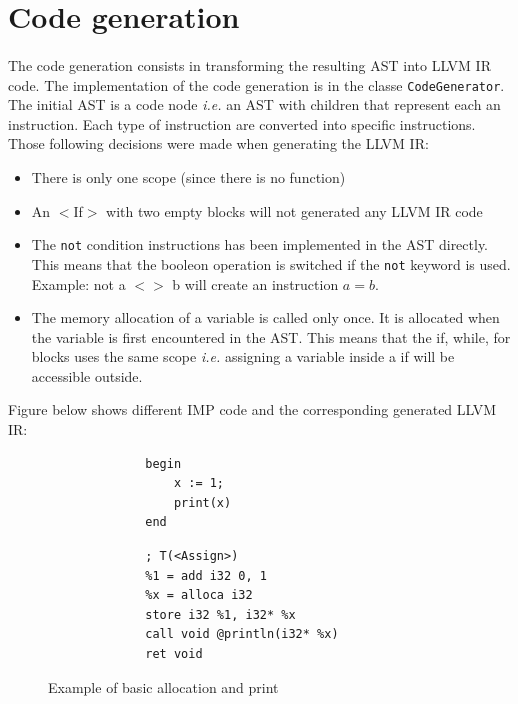 \documentclass[letterpaper]{article}
\begin{document}
\section{Code generation}

\paragraph{}

The code generation consists in transforming the resulting AST into
LLVM IR code. The implementation of the code generation is in the
classe \texttt{CodeGenerator}. The initial AST is a code node \textit{i.e.}
an AST with children that represent each an instruction. Each type of
instruction are converted into specific instructions. Those following
decisions were made when generating the LLVM IR:

\begin{itemize}
    \item There is only one scope (since there is no function)
    \item An $<$If$>$ with
    two empty blocks will not generated any LLVM IR code
    \item The \texttt{not} condition
    instructions has been implemented in the AST directly. This means that
    the booleon operation is switched if the \texttt{not} keyword is used.
    Example: not a $<>$ b will create an instruction $a = b$.
    \item The memory allocation of a variable is called only once.
    It is allocated when the variable is first encountered in the AST.
    This means that the if, while, for blocks uses the same scope \textit{i.e.}
    assigning a variable inside a if will be accessible outside.

\end{itemize}

Figure below shows different IMP code and the corresponding generated
LLVM IR:

\begin{figure}[H]
    \begin{subfigure}{.5\textwidth}
        \begin{lstlisting}
        begin
            x := 1;
            print(x)
        end
        \end{lstlisting}
    \end{subfigure}
    \begin{subfigure}{.5\textwidth}
        \begin{lstlisting}
        ; T(<Assign>)
    	%1 = add i32 0, 1
    	%x = alloca i32
    	store i32 %1, i32* %x
        call void @println(i32* %x)
    	ret void
        \end{lstlisting}
    \end{subfigure}
    \caption{Example of basic allocation and print}
\end{figure}
\end{document}
